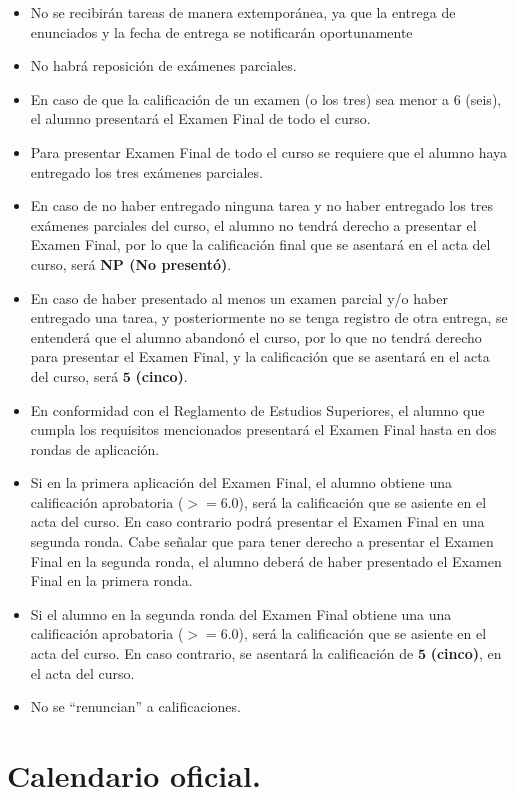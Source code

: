 \documentclass[12pt]{article}
\numberwithin{equation}{section}
\begin{document}
\begin{itemize}
\setlength{\itemsep}{0mm}
\item No se recibirán tareas de manera extemporánea, ya que la entrega de enunciados y la fecha de entrega se notificarán oportunamente
\item No habrá reposición de exámenes parciales.
\item En caso de que la calificación de un examen (o los tres) sea menor a $6$ (seis), el alumno presentará el Examen Final de todo el curso.
\item Para presentar Examen Final de todo el curso se requiere que el alumno haya entregado los tres exámenes parciales.
\item En caso de no haber entregado ninguna tarea y no haber entregado los tres exámenes parciales del curso, el alumno no tendrá derecho a presentar el Examen Final, por lo que la calificación final que se asentará en el acta del curso, será \textbf{NP (No presentó)}.
\item En caso de haber presentado al menos un examen parcial y/o haber entregado una tarea, y posteriormente no se tenga registro de otra entrega, se entenderá que el alumno abandonó el curso, por lo que no tendrá derecho para presentar el Examen Final, y la calificación que se asentará en el acta del curso, será $\mathbf{5}$ \textbf{(cinco)}.
\item En conformidad con el Reglamento de Estudios Superiores, el alumno que cumpla los requisitos mencionados presentará el Examen Final hasta en dos rondas de aplicación.
\item Si en la primera aplicación del Examen Final, el alumno obtiene una calificación aprobatoria ($>=6.0$), será la calificación que se asiente en el acta del curso. En caso contrario podrá presentar el Examen Final en una segunda ronda. Cabe señalar que para tener derecho a presentar el Examen Final en la segunda ronda, el alumno deberá de haber presentado el Examen Final en la primera ronda.
\item Si el alumno en la segunda ronda del Examen Final obtiene una  una calificación aprobatoria ($>=6.0$), será la calificación que se asiente en el acta del curso. En caso contrario, se asentará la calificación de $\mathbf{5}$ \textbf{(cinco)}, en el acta del curso.
\item No se \enquote{renuncian} a calificaciones.
\end{itemize}

\section{Calendario oficial.}
\end{document}
